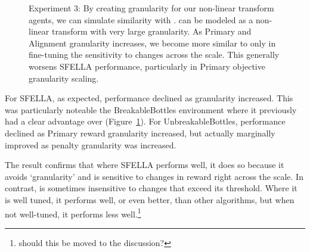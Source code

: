 \begin{figure}
  \caption{Experiment 3: By creating granularity for our non-linear transform agents, we can simulate similarity with \tloA{}. \tloA{} can be modeled as a non-linear transform with very large granularity. As Primary and Alignment granularity increases, we become more similar to \tloA{} only in fine-tuning the sensitivity to changes across the scale. This generally worsens SFELLA performance, particularly in Primary objective granularity scaling.
  }
   \label{fig:exp3_main}

 \end{figure}
 
For SFELLA, as expected, \RStar{} performance declined as granularity increased. This was particularly noteable the BreakableBottles environment where it previously had a clear advantage over \tloA{} (Figure~\ref{fig:exp3_main}). For UnbreakableBottles, performance declined as Primary reward granularity increased, but actually marginally improved as penalty granularity was increased.%

The result confirms that where SFELLA performs well, it does so because it avoids `granularity' and is sensitive to changes in reward right across the scale. In contrast, \tloA{} is sometimes insensitive to changes that exceed its threshold. Where it is well tuned, it performs well, or even better, than other algorithms, but when not well-tuned, it performs less well.\footnote{should this be moved to the discussion?}





